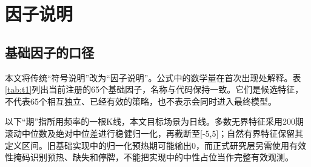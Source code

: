 \documentclass[UTF8,12pt,a4paper,fontset=none]{ctexart}
\begin{document}
\section{因子说明}

\subsection{基础因子的口径}

本文将传统“符号说明”改为“因子说明”。公式中的数学量在首次出现处解释。表\ref{tab:t1}列出当前注册的65个基础因子，名称与代码保持一致。它们是候选特征，不代表65个相互独立、已经有效的策略，也不表示会同时进入最终模型。


以下“期”指所用频率的一根K线，本文目标场景为日线。多数无界特征采用200期滚动中位数及绝对中位差进行稳健归一化，再截断至[-5,5]；自然有界特征保留其定义区间。旧基础实现中的归一化预热期可能输出0，而正式研究层另需使用有效性掩码识别预热、缺失和停牌，不能把实现中的中性占位当作完整有效观测。
\end{document}
